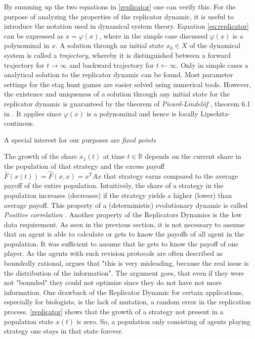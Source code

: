 \documentclass[11pt]{article}
\newcommand{\realnumb}{\mathbb{R}}
\begin{document}
By summing up the two equations in \eqref{replicator} one can verify this.
For the purpose of analyzing the properties of the replicator dynamic, it is 
useful to introduce the notation used in dynamical system theory. 
Equation \eqref{eq:replicator} can be expressed as $\dot{x}=\varphi(x)$, where in
the simple case discussed $\varphi(x)$ is a polynominal in $x$.
A solution through an initial state $x_0 \in X$ of the dynamical system is called a 
\textit{trajectory}, whereby it is distinguished between a forward trajectory 
for $t \rightarrow \infty$ and backward trajectory for $t \leftarrow \infty$.
Only in simple cases a analytical solution to the replicator dynamic can be 
found. Most parameter settings for the stag hunt games are easier solved using
numerical tools. However, the existence and uniqueness of a solution through
any initial state for the replicator dynamic is guaranteed by the theorem 
of \textit{Picard-Lindel\"of} , theorem 6.1 in 
\textcite[74]{weibull_evolutionary_1997}. It applies since $\varphi(x)$ is a 
polynominal and hence is locally Lipschitz-continous. 

A special interest for our purposes are \textit{fixed points} 

The growth of the share $\dot{x}_1(t)$ at time $t \in \realnumb$ depends on the current share in the
population of that strategy and the excess payoff $\bar{F}(x(t)) 
= \hat{F}(x,x) = x^T A x$ that strategy earns 
compared to the average payoff of the entire population. Intuitively, the
share of a strategy in the population increases (decreases) if the strategy
yields a higher (lower) than average payoff. This property of a (deterministic)
evolutionary dynamic is called \textit{Positive correlation} \cite{sandholm}.
Another property of the Replicators Dynamics is the low data requirement. As 
seen in the previous section, it is not necessary to assume that an agent
is able to calculate or gets to know the payoffs of all agent in the population.
It was sufficient to assume that he gets to know the payoff of one player. 
As the agents with such revision protocols are often described as boundedly
rational, \cite{gintis} argues that "this is very misleading, because the real 
issue is the distribution of the information". The argument goes, that even
if they were not "bounded" they could not optimize since they do not have
not more information. 
One drawback of the Replicator Dynamic for certain applications, especially
for biologists, is the lack of mutation, a random error in the replication 
process.
\eqref{replicator} shows that the growth of a strategy not present in a 
population state $x(t)$ is zero. So, a population only consisting of agents
playing strategy one stays in that state forever. 
\end{document}
